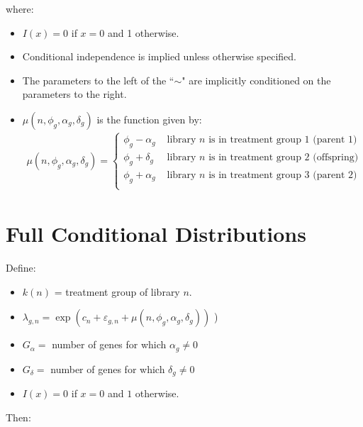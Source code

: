 \documentclass{article}\usepackage{graphicx, color}
\providecommand{\e}{\varepsilon}
\begin{document}
\begin{flushleft}
where:
\begin{itemize}
\item $I(x) = 0$ if $x = 0$ and 1 otherwise. 
\item Conditional independence is implied unless otherwise specified.
\item The parameters to the left of the ``$\sim$" are implicitly conditioned on the parameters to the right.
\item  $\mu(n, \phi_g, \alpha_g, \delta_g)$ is the function given by:
\begin{align*}
\mu(n, \phi_g, \alpha_g, \delta_g) = \begin{cases}
\phi_g - \alpha_g & \text{ library $n$ is in treatment group 1 (parent 1)} \\
\phi_g + \delta_g & \text{ library $n$ is in treatment group 2 (offspring)} \\
\phi_g + \alpha_g & \text{ library $n$ is in treatment group 3 (parent 2)} \\
\end{cases}
\end{align*}

\end{itemize}




\section{Full Conditional Distributions}

Define:

\begin{itemize}
\item  $k(n)$ = treatment group of library $n$.
\item $\lambda_{g, n} = \exp(c_n + \e_{g, n} + \mu(n, \phi_g, \alpha_g, \delta_g))$ )
\item $G_\alpha = $ number of genes for which $\alpha_g \ne 0$
\item $G_\delta = $ number of genes for which $\delta_g \ne 0$
\item $I(x) = 0$ if $x = 0$ and $1$ otherwise.
\end{itemize}

Then: 


\end{flushleft}
\end{document}
